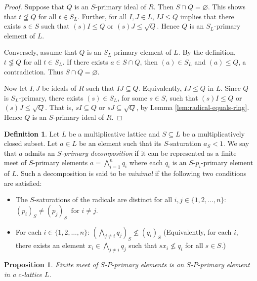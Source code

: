 \documentclass[10pt,twoside,a4]{amsart}
\numberwithin{equation}{section}
\theoremstyle{plain}
\newtheorem{prop}[lem]{Proposition}
\theoremstyle{definition}
\newtheorem{definition}[lem]{Definition}
\begin{document}
\begin{proof}
	Suppose that $Q$ is an $S$-primary ideal of $R$.  
	Then $S\cap Q=\varnothing$. This shows that  $t\not\leqq Q$ for all $t\in S_L$.
	Further, for all $I,J\in L$, $IJ\leq Q$ implies that there exists $s\in S$ such that
	$(s)I\leq Q$ or $(s)J\leq \sqrt{Q}$.
	Hence $Q$ is an $S_L$-primary element of $L$.
	
	Conversely, assume that $Q$ is an $S_L$-primary element of $L$.  
	By the definition, $t\not\leqq Q$ for all $t\in S_L$.  
	If there exists $a\in S\cap Q$, then $(a)\in S_L$ and $(a)\leq Q$, a contradiction.
	Thus $S\cap Q=\varnothing$.
	
	Now let $I,J$ be ideals of $R$ such that $IJ\subseteq Q$.
	Equivalently, $IJ\leq Q$ in $L$.
	Since $Q$ is $S_L$-primary, there exists $(s)\in S_L$, for some $s\in S$, such that
	$(s)I\leq Q$ or $(s)J\leq \sqrt{Q}$.
	That is, $sI\subseteq Q$ or $sJ\subseteq \sqrt{Q}$, by Lemma \ref{lem:radical-equals-ring}.
	Hence $Q$ is an $S$-primary ideal of $R$.
\end{proof}

\begin{definition}
	Let $L$ be a multiplicative lattice and $S \subseteq L$ be a multiplicatively closed subset. Let $a \in L$ be an element such that its $S$-saturation $a_S < 1$. We say that $a$ admits an \textit{$S$-primary decomposition } if it can be represented as a finite meet of $S$-primary elements
	$a = \bigwedge_{i=1}^{n} q_i$ where each $q_i$ is an $S$-$p_i$-primary element of $L$. Such a decomposition is said to be \textit{minimal }  if the following two conditions are satisfied:
	\begin{itemize}
		\item The $S$-saturations of the radicals are distinct for all $i, j \in \{1, 2, \dots, n\}$:
		$(p_i)_S \neq (p_j)_S \;\; \text{for } i \neq j$.
		\item   For each $i \in \{1, 2, \dots, n\}$:
		$\left( \bigwedge_{j \neq i} q_j \right)_S \not\leq (q_i)_S$ (Equivalently, for each $i$, there exists an element $x_i \in \bigwedge_{j \neq i} q_j$ such that $s x_i \not\leq q_i$ for all $s \in S$.)
	\end{itemize} 
\end{definition}



\begin{prop}\label{prop:finite-intersection-S-primary}
	Finite meet of $S$-$P$-primary elements is an $S$-$P$-primary element in a $c$-lattice $L$.
\end{prop}
\end{document}
